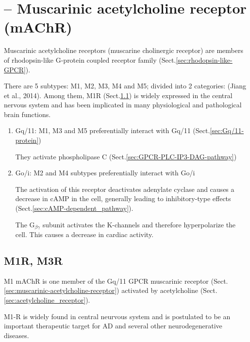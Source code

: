 \section{-- Muscarinic acetylcholine receptor (mAChR)}
\label{sec:mAchR}
\label{sec:muscarinic-acetylcholine-receptor}

Muscarinic acetylcholine receptors (muscarine cholinergic receptor) are members
of rhodopsin-like G-protein coupled receptor family
(Sect.\ref{sec:rhodopsin-like-GPCR}). 

There are 5 subtypes: M1, M2, M3, M4 and M5; divided into 2 categories:
(Jiang et al., 2014).  Among them, M1R (Sect.\ref{sec:M1-muscarinic-receptor})
is widely expressed in the central nervous system and has been implicated in
many physiological and pathological brain functions.

\begin{enumerate}
  
  \item Gq/11: M1, M3 and M5 preferentially interact with Gq/11 
  (Sect.\ref{sec:Gq/11-protein})
  
  They activate phospholipase C  (Sect.\ref{sec:GPCR-PLC-IP3-DAG-pathway})

  \item Go/i: M2 and M4 subtypes preferentially interact with Go/i

The activation of this receptor deactivates adenylate cyclase and causes a
decrease in cAMP in the cell, generally leading to inhibitory-type effects
(Sect.\ref{sec:cAMP-dependent_pathway}).

The G$_{\beta\gamma}$ subunit activates the K-channels and therefore
hyperpolarize the cell. This causes a decrease in cardiac activity.

\end{enumerate}



\subsection{M1R, M3R}
\label{sec:M1-muscarinic-receptor}
\label{sec:M3-muscarinic-receptor}

M1 mAChR is one member of the Gq/11 GPCR muscarinic receptor
(Sect.\ref{sec:muscarinic-acetylcholine-receptor}) activated by acetylcholine
(Sect.\ref{sec:acetylcholine_receptor}).

M1-R is widely found in central neurvous system and is postulated to be an
important therapeutic target for AD and several other neurodegenerative
diseases.

